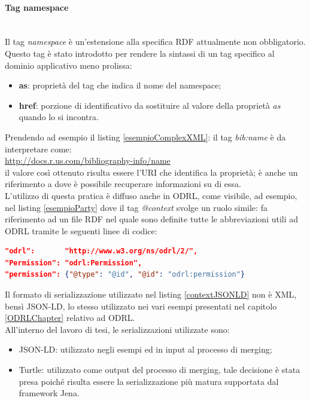 \documentclass[12pt,a4paper,twoside]{book}
\begin{document}
\paragraph{Tag namespace}\mbox{}\\
Il tag \textit{namespace} è un'estensione alla specifica RDF attualmente non obbligatorio. Questo tag è stato introdotto per rendere la sintassi di un tag specifico al dominio applicativo meno prolissa:
\begin{itemize}
 \item \textbf{as}: proprietà del tag che indica il nome del namespace;
 \item \textbf{href}: porzione di identificativo da sostituire al valore della proprietà \textit{as} quando lo si incontra.
\end{itemize} 
Prendendo ad esempio il listing \ref{esempioComplexXML}: il tag \textit{bib:name} è da interpretare come: \\\url{http://docs.r.us.com/bibliography-info/name}\\ il valore così ottenuto risulta essere l'URI che identifica la proprietà; è anche un riferimento a dove è possibile recuperare informazioni su di essa.\\
L'utilizzo di questa pratica è diffuso anche in ODRL, come visibile, ad esempio, nel listing \ref{esempioParty} dove il tag \textit{@context} svolge un ruolo simile: fa riferimento ad un file RDF nel quale sono definite tutte le abbreviazioni utili ad ODRL tramite le seguenti linee di codice:
\begin{lstlisting}[language=json,firstnumber=1,caption={Estratto context ODRL\cite{ODRLContext}},captionpos=b,label=contextJSONLD]
"odrl":       "http://www.w3.org/ns/odrl/2/",
"Permission": "odrl:Permission",
"permission": {"@type": "@id", "@id": "odrl:permission"}
\end{lstlisting}
Il formato di serializzazione utilizzato nel listing \ref{contextJSONLD} non è XML, bensì JSON-LD, lo stesso utilizzato nei vari esempi presentati nel capitolo \ref{ODRLChapter} relativo ad ODRL.\\
All'interno del lavoro di tesi, le serializzazioni utilizzate sono:
\begin{itemize}
\item JSON-LD: utilizzato negli esempi ed in input al processo di merging;
\item Turtle\cite{Turtle}: utilizzato come output del processo di merging, tale decisione è stata presa poiché risulta essere la serializzazione più matura supportata dal framework Jena.
\end{itemize}
\end{document}
